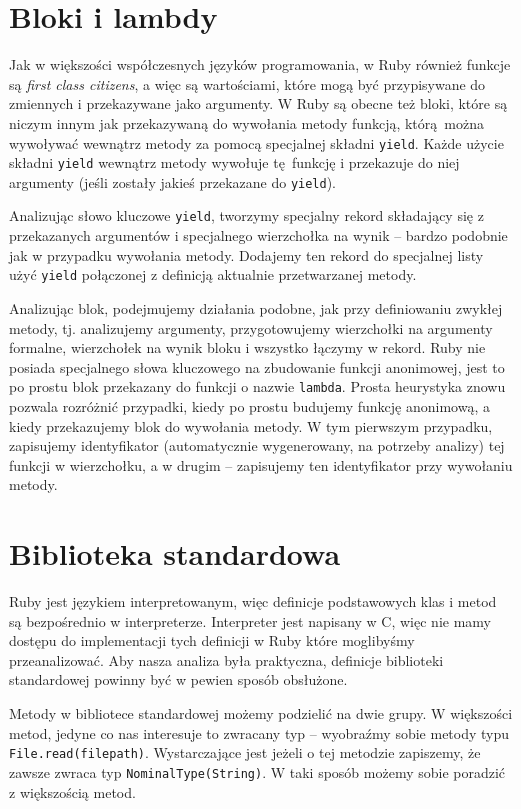 \documentclass[declaration,shortabstract,mgr]{iithesis}
\begin{document}
\section{Bloki i lambdy}

Jak w większości współczesnych języków programowania, w Ruby również funkcje są \textit{first class citizens}, a więc są wartościami, które mogą być przypisywane do zmiennych i przekazywane jako argumenty. W Ruby są obecne też bloki, które są niczym innym jak przekazywaną do wywołania metody funkcją, którą można wywoływać wewnątrz metody za pomocą specjalnej składni \texttt{yield}. Każde użycie składni \texttt{yield} wewnątrz metody wywołuje tę funkcję i przekazuje do niej argumenty (jeśli zostały jakieś przekazane do \texttt{yield}).

Analizując słowo kluczowe \texttt{yield}, tworzymy specjalny rekord składający się z przekazanych argumentów i specjalnego wierzchołka na wynik -- bardzo podobnie jak w przypadku wywołania metody. Dodajemy ten rekord do specjalnej listy użyć \texttt{yield} połączonej z definicją aktualnie przetwarzanej metody.

Analizując blok, podejmujemy działania podobne, jak przy definiowaniu zwykłej metody, tj. analizujemy argumenty, przygotowujemy wierzchołki na argumenty formalne, wierzchołek na wynik bloku i wszystko łączymy w rekord. Ruby nie posiada specjalnego słowa kluczowego na zbudowanie funkcji anonimowej, jest to po prostu blok przekazany do funkcji o nazwie \texttt{lambda}. Prosta heurystyka znowu pozwala rozróżnić przypadki, kiedy po prostu budujemy funkcję anonimową, a kiedy przekazujemy blok do wywołania metody. W tym pierwszym przypadku, zapisujemy identyfikator (automatycznie wygenerowany, na potrzeby analizy) tej funkcji w wierzchołku, a w drugim -- zapisujemy ten identyfikator przy wywołaniu metody.


\section{Biblioteka standardowa}

Ruby jest językiem interpretowanym, więc definicje podstawowych klas i metod są bezpośrednio w interpreterze. Interpreter jest napisany w C, więc nie mamy dostępu do implementacji tych definicji w Ruby które moglibyśmy przeanalizować. Aby nasza analiza była praktyczna, definicje biblioteki standardowej powinny być w pewien sposób obsłużone.

Metody w bibliotece standardowej możemy podzielić na dwie grupy. W większości metod, jedyne co nas interesuje to zwracany typ -- wyobraźmy sobie metody typu \texttt{File.read(filepath)}. Wystarczające jest jeżeli o tej metodzie zapiszemy, że zawsze zwraca typ \texttt{NominalType(String)}. W taki sposób możemy sobie poradzić z większością metod.
\end{document}
